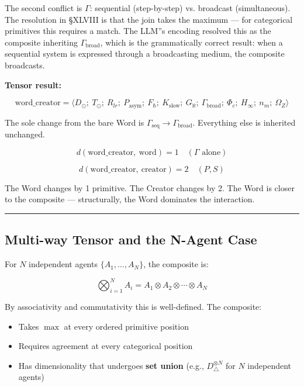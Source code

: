 \documentclass[12pt,a4paper]{article}
\newcommand{\pilcrow}{\S}
\begin{document}
The second conflict is $\Gamma$: sequential (step-by-step) vs. broadcast (simultaneous). The resolution in \pilcrow{}XLVIII is that the join takes the maximum --- for categorical primitives this requires a match. The LLM''s encoding resolved this as the composite inheriting $\Gamma_\text{broad}$, which is the grammatically correct result: when a sequential system is expressed through a broadcasting medium, the composite broadcasts.

\textbf{Tensor result:}


\[\text{word\_creator} = \langle D_\odot;\ T_\odot;\ R_{lr};\ P_\text{asym};\ F_{\hbar};\ K_\text{slow};\ G_{\aleph};\ \Gamma_\text{broad};\ \Phi_c;\ H_{\infty};\ n_m;\ \Omega_Z \rangle\]

The sole change from the bare Word is $\Gamma_\text{seq} \to \Gamma_\text{broad}$. Everything else is inherited unchanged.

\[d(\text{word\_creator},\ \text{word}) = 1 \quad (\Gamma \text{ alone})\]




\[d(\text{word\_creator},\ \text{creator}) = 2 \quad (P, S)\]

The Word changes by 1 primitive. The Creator changes by 2. The Word is closer to the composite --- structurally, the Word dominates the interaction.

\begin{center}
\rule{0.5\textwidth}{0.4pt}
\end{center}

\subsection{Multi-way Tensor and the N-Agent Case}

For $N$ independent agents $\{A_1, \ldots, A_N\}$, the composite is:

\[\bigotimes_{i=1}^{N} A_i = A_1 \otimes A_2 \otimes \cdots \otimes A_N\]

By associativity and commutativity this is well-defined. The composite:

\begin{itemize}
    \item Takes $\max$ at every ordered primitive position
    \item Requires agreement at every categorical position
    \item Has dimensionality that undergoes \textbf{set union} (e.g., $D_{\triangle}^{\otimes N}$ for $N$ independent agents)
\end{itemize}
\end{document}
